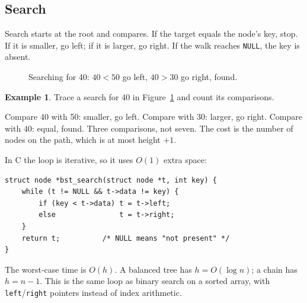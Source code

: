 \documentclass[11pt]{article}
\theoremstyle{definition}
\newtheorem{example}{Example}[section]
\begin{document}
\subsection{Search}

Search starts at the root and compares. If the target equals the node's key,
stop. If it is smaller, go left; if it is larger, go right. If the walk
reaches \texttt{NULL}, the key is absent.

\begin{figure}[h]
  \centering
  \caption{Searching for 40: $40<50$ go left, $40>30$ go right, found.}
  \label{fig:search}
\end{figure}

\begin{example}
Trace a search for 40 in Figure~\ref{fig:search} and count its comparisons.

Compare 40 with 50: smaller, go left. Compare with 30: larger, go right.
Compare with 40: equal, found. Three comparisons, not seven. The cost is the
number of nodes on the path, which is at most height $+1$.
\end{example}

In C the loop is iterative, so it uses $O(1)$ extra space:

\begin{verbatim}
struct node *bst_search(struct node *t, int key) {
    while (t != NULL && t->data != key) {
        if (key < t->data) t = t->left;
        else               t = t->right;
    }
    return t;          /* NULL means "not present" */
}
\end{verbatim}

The worst-case time is $O(h)$. A balanced tree has $h=O(\log n)$; a chain has
$h=n-1$. This is the same loop as binary search on a sorted array, with
\texttt{left}/\texttt{right} pointers instead of index arithmetic.
\end{document}
